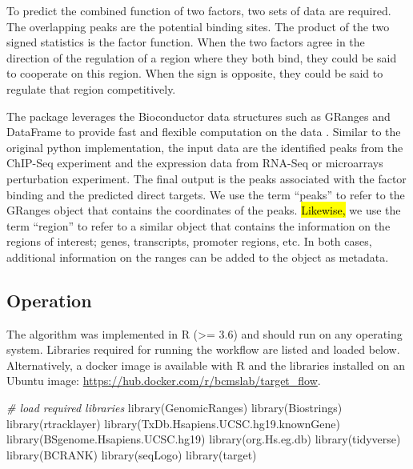 \documentclass[9pt,a4paper,]{extarticle}
\newenvironment{Shaded}{\begin{snugshade}}{\end{snugshade}}
\newcommand{\CommentTok}[1]{\textcolor[rgb]{0.56,0.35,0.01}{\textit{#1}}}
\newcommand{\FunctionTok}[1]{\textcolor[rgb]{0.00,0.00,0.00}{#1}}
\newcommand{\NormalTok}[1]{#1}
\begin{document}
To predict the combined function of two factors, two sets of data are required. The overlapping peaks are the potential binding sites. The product of the two signed statistics is the factor function. When the two factors agree in the direction of the regulation of a region where they both bind, they could be said to cooperate on this region. When the sign is opposite, they could be said to regulate that region competitively.

The package leverages the Bioconductor data structures such as GRanges and DataFrame to provide fast and flexible computation on the data \citet{Huber2015}. Similar to the original python implementation, the input data are the identified peaks from the ChIP-Seq experiment and the expression data from RNA-Seq or microarrays perturbation experiment. The final output is the peaks associated with the factor binding and the predicted direct targets. We use the term ``peaks'' to refer to the GRanges object that contains the coordinates of the peaks. \hl{Likewise,} we use the term ``region'' to refer to a similar object that contains the information on the regions of interest; genes, transcripts, promoter regions, etc. In both cases, additional information on the ranges can be added to the object as metadata.

\hypertarget{operation}{%
\subsection{Operation}\label{operation}}

The algorithm was implemented in R (\textgreater= 3.6) and should run on any operating system. Libraries required for running the workflow are listed and loaded below. Alternatively, a docker image is available with R and the libraries installed on an Ubuntu image: \url{https://hub.docker.com/r/bcmslab/target_flow}.

\begin{Shaded}
\begin{Highlighting}[]
\CommentTok{\# load required libraries}
\FunctionTok{library}\NormalTok{(GenomicRanges)}
\FunctionTok{library}\NormalTok{(Biostrings)}
\FunctionTok{library}\NormalTok{(rtracklayer)}
\FunctionTok{library}\NormalTok{(TxDb.Hsapiens.UCSC.hg19.knownGene)}
\FunctionTok{library}\NormalTok{(BSgenome.Hsapiens.UCSC.hg19)}
\FunctionTok{library}\NormalTok{(org.Hs.eg.db)}
\FunctionTok{library}\NormalTok{(tidyverse)}
\FunctionTok{library}\NormalTok{(BCRANK)}
\FunctionTok{library}\NormalTok{(seqLogo)}
\FunctionTok{library}\NormalTok{(target)}
\end{Highlighting}
\end{Shaded}
\end{document}

